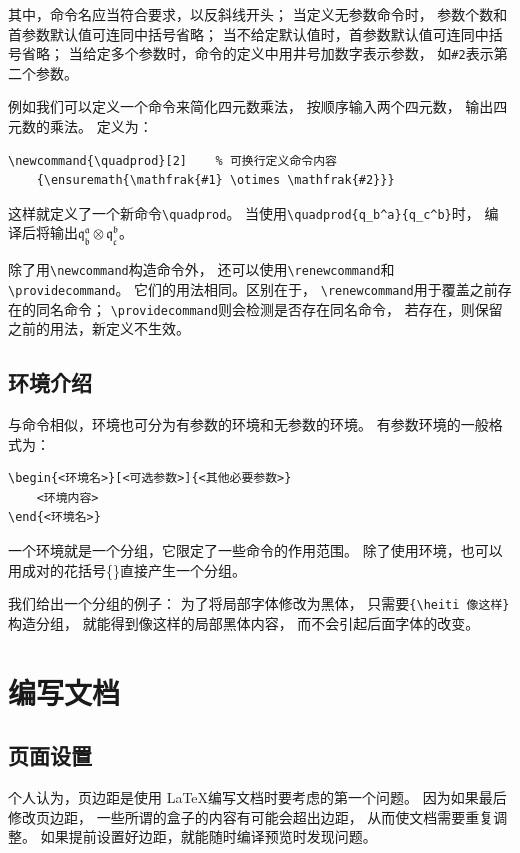 \documentclass[UTF8]{ctexart}
\numberwithin{equation}{section}			%
\newcommand{\quadprod}[2]
    {\ensuremath{\mathfrak{#1} \otimes \mathfrak{#2}}}
\begin{document}
    其中，命令名应当符合要求，以反斜线开头；
    当定义无参数命令时，
    参数个数和首参数默认值可连同中括号省略；
    当不给定默认值时，首参数默认值可连同中括号省略；
    当给定多个参数时，命令的定义中用井号加数字表示参数，
    如\verb|#2|表示第二个参数。
    
    例如我们可以定义一个命令来简化四元数乘法，
    按顺序输入两个四元数，
    输出四元数的乘法。
    定义为：
    
\begin{lstlisting}
\newcommand{\quadprod}[2]    % 可换行定义命令内容
    {\ensuremath{\mathfrak{#1} \otimes \mathfrak{#2}}}
\end{lstlisting}
    
    这样就定义了一个新命令\verb|\quadprod|。
    当使用\verb|\quadprod{q_b^a}{q_c^b}|时，
    编译后将输出\quadprod{q_b^a}{q_c^b}。
    
    除了用\verb|\newcommand|构造命令外，
    还可以使用\verb|\renewcommand|和\verb|\providecommand|。
    它们的用法相同。区别在于，
    \verb|\renewcommand|用于覆盖之前存在的同名命令；
    \verb|\providecommand|则会检测是否存在同名命令，
    若存在，则保留之前的用法，新定义不生效。
    
    \subsection{环境介绍}
    与命令相似，环境也可分为有参数的环境和无参数的环境。
    有参数环境的一般格式为：
    
\begin{lstlisting}
\begin{<环境名>}[<可选参数>]{<其他必要参数>} 
    <环境内容>
\end{<环境名>} 
\end{lstlisting}
    
    一个环境就是一个分组，它限定了一些命令的作用范围。
    除了使用环境，也可以用成对的花括号\{\}直接产生一个分组。
    
    我们给出一个分组的例子：
    为了将局部字体修改为黑体，
    只需要\verb|{\heiti 像这样}|构造分组，
    就能得到{\heiti 像这样}的局部黑体内容，
    而不会引起后面字体的改变。

    \section{编写文档}
    \subsection{页面设置}
    个人认为，页边距是使用 \LaTeX 编写文档时要考虑的第一个问题。
    因为如果最后修改页边距，
    一些所谓的盒子的内容有可能会超出边距，
    从而使文档需要重复调整。
    如果提前设置好边距，就能随时编译预览时发现问题。
    
\end{document}
